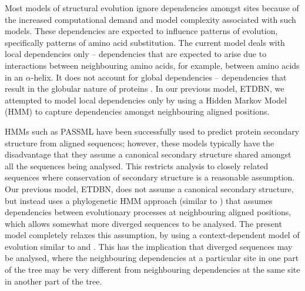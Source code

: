 \documentclass[nogrid]{MBE}%
\begin{document}
Most models of structural evolution ignore dependencies amongst sites because of the increased computational demand and model complexity associated with such models. These dependencies are expected to influence patterns of evolution, specifically patterns of amino acid substitution. The current model deals with local dependencies only -- dependencies that are expected to arise due to interactions between neighbouring amino acids, for example, between amino acids in an $\alpha$-helix. It does not account for global dependencies -- dependencies that result in the globular nature of proteins \citep{boomsma2008generative}. In our previous model, ETDBN, we attempted to model local dependencies only by using a Hidden Markov Model (HMM) to capture dependencies amongst neighbouring aligned positions. 

HMMs such as PASSML \citep{li1998passml} have been successfully used to predict protein secondary structure from aligned sequences; however, these models typically have the disadvantage that they assume a canonical secondary structure shared amongst all the sequences being analysed. This restricts analysis to closely related sequences where conservation of secondary structure is a reasonable assumption. Our previous model, ETDBN, does not assume a canonical secondary structure, but instead uses a phylogenetic HMM approach (similar to \citet{siepel2004combining}) that assumes dependencies between evolutionary processes at neighbouring aligned positions, which allows somewhat more diverged sequences to be analysed. The present model completely relaxes this assumption, by using a context-dependent model of evolution similar to \citet{robinson2003protein} and \citep{yu2006dependence}. This has the implication that  diverged sequences may be analysed, where the neighbouring dependencies at a particular site in one part of the tree may be very different from neighbouring dependencies at the same site in another part of the tree.
\end{document}
